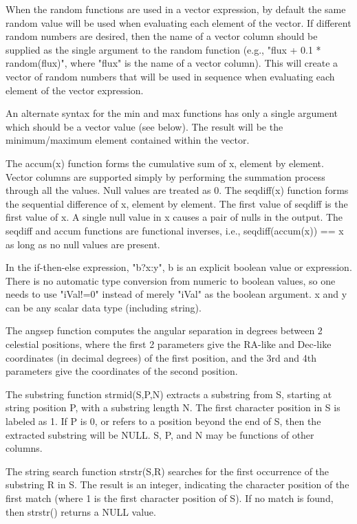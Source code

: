 \documentclass[11pt]{book}
\begin{document}
When the random functions are used in a vector expression, by default
the same random value will be used when evaluating each element of the
vector.  If different random numbers are desired, then the name of a
vector column should be supplied as the single argument to the random
function (e.g., "flux + 0.1 * random(flux)", where "flux" is the name
of a vector column).  This will create a vector of random numbers that
will be used in sequence when evaluating each element of the vector
expression.

An alternate syntax for the min and max functions  has only a single
argument which  should be  a  vector value (see  below).  The result
will be the minimum/maximum element contained within the vector.

The accum(x) function forms the cumulative sum of x, element by
element.  Vector columns are supported simply by performing the
summation process through all the values.  Null values are treated as
0.  The seqdiff(x) function forms the sequential difference of x,
element by element.  The first value of seqdiff is the first value of
x.  A single null value in x causes a pair of nulls in the output.
The seqdiff and accum functions are functional inverses, i.e.,
seqdiff(accum(x)) == x as long as no null values are present.

In the if-then-else expression, "b?x:y", b is an explicit boolean
value or expression.  There is no automatic type conversion from
numeric to boolean values, so one needs to use "iVal!=0" instead of
merely "iVal" as the boolean argument. x and y can be any scalar data
type (including string).

The angsep function computes the angular separation in degrees between
2 celestial positions, where the first 2 parameters give the RA-like
and Dec-like coordinates (in decimal degrees) of the first position,
and the 3rd and 4th parameters give the coordinates of the second
position.

The substring function strmid(S,P,N) extracts a substring from S,
starting at string position P, with a substring length N.  The first
character position in S is labeled as 1. If P is 0, or refers to a
position beyond the end of S, then the extracted substring will be
NULL.  S, P, and N may be functions of other columns.

The string search function strstr(S,R) searches for the first
occurrence of the substring R in S.  The result is an integer,
indicating the character position of the first match (where 1 is the
first character position of S).  If no match is found, then strstr()
returns a NULL value.
\end{document}
